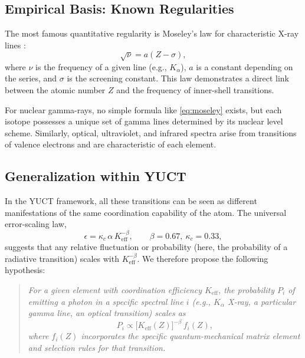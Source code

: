 \documentclass[12pt,a4paper]{article}
\theoremstyle{remark}
\begin{document}
	\subsection{Empirical Basis: Known Regularities}
	
	The most famous quantitative regularity is Moseley's law for characteristic X-ray lines \cite{Moseley1913}:
	\begin{equation}
		\sqrt{\nu} = a (Z - \sigma),
		\label{eq:moseley}
	\end{equation}
	where \(\nu\) is the frequency of a given line (e.g., \(K_\alpha\)), \(a\) is a constant depending on the series, and \(\sigma\) is the screening constant. This law demonstrates a direct link between the atomic number \(Z\) and the frequency of inner-shell transitions.
	
	For nuclear gamma-rays, no simple formula like \eqref{eq:moseley} exists, but each isotope possesses a unique set of gamma lines determined by its nuclear level scheme. Similarly, optical, ultraviolet, and infrared spectra arise from transitions of valence electrons and are characteristic of each element.
	
	\subsection{Generalization within YUCT}
	
	In the YUCT framework, all these transitions can be seen as different manifestations of the same coordination capability of the atom. The universal error-scaling law,
	\begin{equation}
		\epsilon = \kappa_c \, \alpha \, K_{\mathrm{eff}}^{-\beta}, \qquad \beta = 0.67,\ \kappa_c = 0.33,
		\label{eq:universal_law}
	\end{equation}
	suggests that any relative fluctuation or probability (here, the probability of a radiative transition) scales with \(K_{\mathrm{eff}}^{-\beta}\). We therefore propose the following hypothesis:
	
	\begin{quote}
		\emph{For a given element with coordination efficiency \(K_{\mathrm{eff}}\), the probability \(P_i\) of emitting a photon in a specific spectral line \(i\) (e.g., \(K_\alpha\) X-ray, a particular gamma line, an optical transition) scales as}
		\begin{equation}
			P_i \propto \bigl[K_{\mathrm{eff}}(Z)\bigr]^{-\beta} \, f_i(Z),
			\label{eq:prob_scaling}
		\end{equation}
		\emph{where \(f_i(Z)\) incorporates the specific quantum-mechanical matrix element and selection rules for that transition.}
	\end{quote}
	
\end{document}
